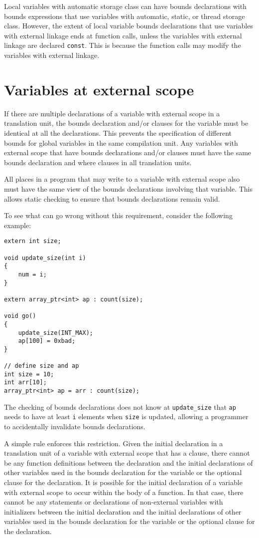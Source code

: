 Local variables with automatic storage class can have bounds
declarations with bounds expressions that use variables with automatic,
static, or thread storage class. However, the extent of local variable
bounds declarations that use variables with external linkage ends at
function calls, unless the variables with external linkage are declared
\texttt{const}. This is because the function calls may modify the
variables with external linkage.

\section{Variables at external scope}
\label{section:external-scope-variables}

If there are multiple declarations of a variable with external scope in
a translation unit, the bounds declaration and/or  clauses for the
variable must be identical at all the declarations. This prevents the
specification of different bounds for global variables in the same
compilation unit. Any variables with external scope that have bounds
declarations and/or  clauses must have the same bounds declaration
and where clauses in all translation units.

All places in a program that may write to a variable with external scope
also must have the same view of the bounds declarations involving that
variable. This allows static checking to ensure that bounds declarations
remain valid.

To see what can go wrong without this requirement, consider the
following example:

\begin{verbatim}
extern int size;

void update_size(int i)
{
    num = i;
}

extern array_ptr<int> ap : count(size);

void go()
{
    update_size(INT_MAX);
    ap[100] = 0xbad;
}

// define size and ap
int size = 10;
int arr[10];
array_ptr<int> ap = arr : count(size);
\end{verbatim}

The checking of bounds declarations does not know at
\texttt{update\_size} that \texttt{ap} needs to have at least \texttt{i}
elements when \texttt{size} is updated, allowing a programmer to accidentally
invalidate bounds declarations.

A simple rule enforces this restriction. Given the initial declaration
in a translation unit of a variable with external scope that has a
 clause, there cannot be any function definitions between
the declaration and the initial declarations of other variables used in
the bounds declaration for the variable or the optional  clause for the declaration.
It is possible for the initial declaration of
a variable with external scope to occur within the body of a function.
In that case, there cannot be any statements or declarations of
non-external variables with initializers between the initial declaration
and the initial declarations of other variables used in the
bounds declaration for the variable or the optional  clause for
the declaration.

